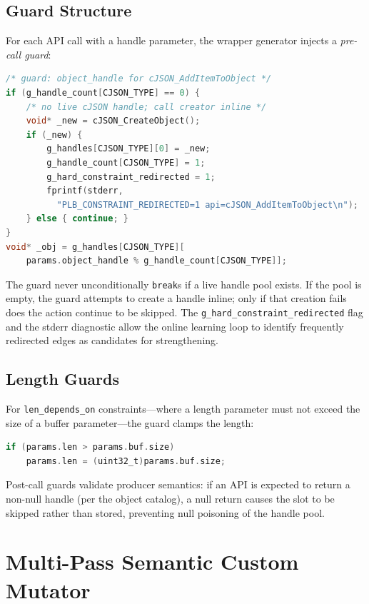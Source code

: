\documentclass[sigconf,anonymous]{acmart}
\begin{document}
\subsection{Guard Structure}

For each API call with a handle parameter, the wrapper generator injects
a \emph{pre-call guard}:

\begin{lstlisting}[language=C, caption={RNR guard for set\_by constraint.}]
/* guard: object_handle for cJSON_AddItemToObject */
if (g_handle_count[CJSON_TYPE] == 0) {
    /* no live cJSON handle; call creator inline */
    void* _new = cJSON_CreateObject();
    if (_new) {
        g_handles[CJSON_TYPE][0] = _new;
        g_handle_count[CJSON_TYPE] = 1;
        g_hard_constraint_redirected = 1;
        fprintf(stderr,
          "PLB_CONSTRAINT_REDIRECTED=1 api=cJSON_AddItemToObject\n");
    } else { continue; }
}
void* _obj = g_handles[CJSON_TYPE][
    params.object_handle % g_handle_count[CJSON_TYPE]];
\end{lstlisting}

The guard never unconditionally \texttt{break}s if a live handle pool exists.
If the pool is empty, the guard attempts to create a handle inline; only
if that creation fails does the action continue to be skipped.  The
\texttt{g\_hard\_constraint\_redirected} flag and the stderr diagnostic
allow the online learning loop to identify frequently redirected edges as
candidates for strengthening.

\subsection{Length Guards}

For \texttt{len\_depends\_on} constraints---where a length parameter must
not exceed the size of a buffer parameter---the guard clamps the length:

\begin{lstlisting}[language=C]
if (params.len > params.buf.size)
    params.len = (uint32_t)params.buf.size;
\end{lstlisting}

Post-call guards validate producer semantics: if an API is expected to
return a non-null handle (per the object catalog), a null return causes
the slot to be skipped rather than stored, preventing null poisoning of
the handle pool.

\section{Multi-Pass Semantic Custom Mutator}
\label{sec:mutator}
\end{document}
